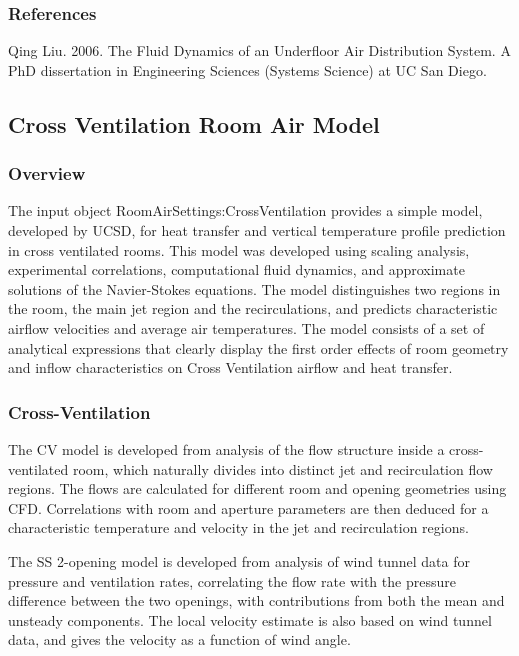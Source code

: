 \subsubsection{References}\label{references-4-000}

Qing Liu. 2006. The Fluid Dynamics of an Underfloor Air Distribution System. A PhD dissertation in Engineering Sciences (Systems Science) at UC San Diego.

\subsection{Cross Ventilation Room Air Model}\label{cross-ventilation-room-air-model}

\subsubsection{Overview}\label{overview-3-001}

The input object RoomAirSettings:CrossVentilation provides a simple model, developed by UCSD, for heat transfer and vertical temperature profile prediction in cross ventilated rooms. This model was developed using scaling analysis, experimental correlations, computational fluid dynamics, and approximate solutions of the Navier-Stokes equations. The model distinguishes two regions in the room, the main jet region and the recirculations, and predicts characteristic airflow velocities and average air temperatures. The model consists of a set of analytical expressions that clearly display the first order effects of room geometry and inflow characteristics on Cross Ventilation airflow and heat transfer.

\subsubsection{Cross-Ventilation}\label{cross-ventilation}

The CV model is developed from analysis of the flow structure inside a cross-ventilated room, which naturally divides into distinct jet and recirculation flow regions. The flows are calculated for different room and opening geometries using CFD. Correlations with room and aperture parameters are then deduced for a characteristic temperature and velocity in the jet and recirculation regions.

The SS 2-opening model is developed from analysis of wind tunnel data for pressure and ventilation rates, correlating the flow rate with the pressure difference between the two openings, with contributions from both the mean and unsteady components. The local velocity estimate is also based on wind tunnel data, and gives the velocity as a function of wind angle.

